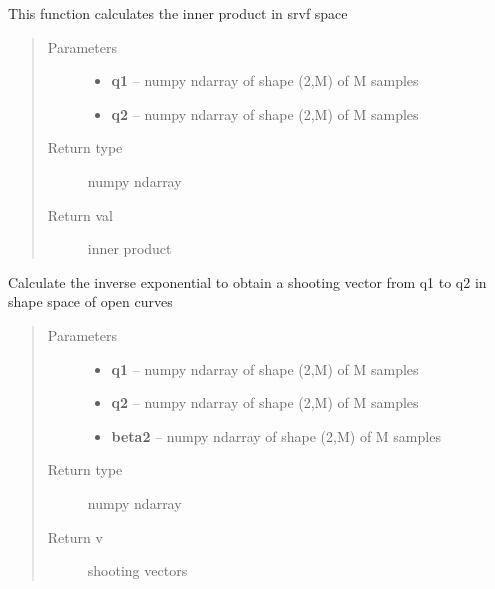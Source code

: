 \documentclass[letterpaper,10pt,english]{sphinxmanual}
\begin{document}

\begin{fulllineitems}
\label{curve_functions:curve_functions.innerprod_q2}
This function calculates the inner product in srvf space
\begin{quote}\begin{description}
\item[{Parameters}] \leavevmode\begin{itemize}
\item {} 
\textbf{q1} -- numpy ndarray of shape (2,M) of M samples

\item {} 
\textbf{q2} -- numpy ndarray of shape (2,M) of M samples

\end{itemize}

\item[{Return type}] \leavevmode
numpy ndarray

\item[{Return val}] \leavevmode
inner product

\end{description}\end{quote}

\end{fulllineitems}


\begin{fulllineitems}
\label{curve_functions:curve_functions.inverse_exp}
Calculate the inverse exponential to obtain a shooting vector from
q1 to q2 in shape space of open curves
\begin{quote}\begin{description}
\item[{Parameters}] \leavevmode\begin{itemize}
\item {} 
\textbf{q1} -- numpy ndarray of shape (2,M) of M samples

\item {} 
\textbf{q2} -- numpy ndarray of shape (2,M) of M samples

\item {} 
\textbf{beta2} -- numpy ndarray of shape (2,M) of M samples

\end{itemize}

\item[{Return type}] \leavevmode
numpy ndarray

\item[{Return v}] \leavevmode
shooting vectors

\end{description}\end{quote}

\end{fulllineitems}
\end{document}
